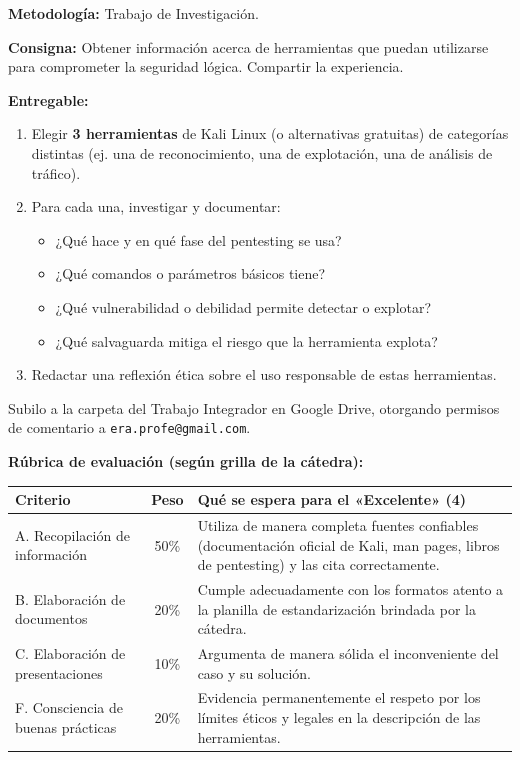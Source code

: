 \documentclass[11pt,a4paper]{article}
\begin{document}
\begin{clave}
\textbf{Metodología:} Trabajo de Investigación.

\textbf{Consigna:} Obtener información acerca de herramientas que puedan utilizarse para comprometer la seguridad lógica. Compartir la experiencia.

\textbf{Entregable:}
\begin{enumerate}
  \item Elegir \textbf{3 herramientas} de Kali Linux (o alternativas gratuitas) de categorías distintas (ej. una de reconocimiento, una de explotación, una de análisis de tráfico).
  \item Para cada una, investigar y documentar:
  \begin{itemize}
    \item ¿Qué hace y en qué fase del pentesting se usa?
    \item ¿Qué comandos o parámetros básicos tiene?
    \item ¿Qué vulnerabilidad o debilidad permite detectar o explotar?
    \item ¿Qué salvaguarda mitiga el riesgo que la herramienta explota?
  \end{itemize}
  \item Redactar una reflexión ética sobre el uso responsable de estas herramientas.
\end{enumerate}

Subilo a la carpeta del Trabajo Integrador en Google Drive, otorgando permisos de comentario a \texttt{era.profe@gmail.com}.
\end{clave}

\textbf{Rúbrica de evaluación (según grilla de la cátedra):}
\begin{center}
\renewcommand{\arraystretch}{1.2}
\begin{tabularx}{\textwidth}{@{} l c X @{}}
\toprule
\textbf{Criterio} & \textbf{Peso} & \textbf{Qué se espera para el «Excelente» (4)} \\
\midrule
A. Recopilación de información & 50\% & Utiliza de manera completa fuentes confiables (documentación oficial de Kali, man pages, libros de pentesting) y las cita correctamente. \\
B. Elaboración de documentos & 20\% & Cumple adecuadamente con los formatos atento a la planilla de estandarización brindada por la cátedra. \\
C. Elaboración de presentaciones & 10\% & Argumenta de manera sólida el inconveniente del caso y su solución. \\
F. Consciencia de buenas prácticas & 20\% & Evidencia permanentemente el respeto por los límites éticos y legales en la descripción de las herramientas. \\
\bottomrule
\end{tabularx}
\end{center}
\end{document}
